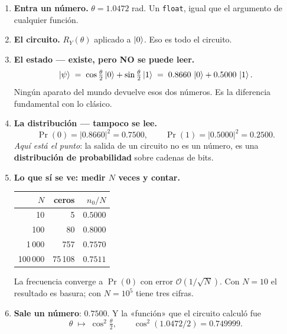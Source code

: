 \documentclass[11pt,a4paper]{article}
\begin{document}
\begin{enumerate}[leftmargin=2em]
  \item \textbf{Entra un número.} $\theta = 1.0472$ rad. Un \texttt{float},
    igual que el argumento de cualquier función.

  \item \textbf{El circuito.} $R_Y(\theta)$ aplicado a $\ket{0}$. Eso es
    todo el circuito.

  \item \textbf{El estado --- existe, pero NO se puede leer.}
    \begin{equation*}
      \ket{\psi} \;=\; \cos\tfrac{\theta}{2}\ket{0}
                     + \sin\tfrac{\theta}{2}\ket{1}
                 \;=\; 0.8660\,\ket{0} + 0.5000\,\ket{1}.
    \end{equation*}
    Ningún aparato del mundo devuelve esos dos números. Es la diferencia
    fundamental con lo clásico.

  \item \textbf{La distribución --- tampoco se lee.}
    \begin{equation*}
      \Pr(0) = |0.8660|^2 = 0.7500,
      \qquad
      \Pr(1) = |0.5000|^2 = 0.2500 .
    \end{equation*}
    \emph{Aquí está el punto}: la salida de un circuito no es un número, es
    una \textbf{distribución de probabilidad} sobre cadenas de bits.

  \item \textbf{Lo que sí se ve: medir $N$ veces y contar.}
    \begin{center}
    \small
    \begin{tabular}{rrr}
    \toprule
    $N$ & ceros & $n_0/N$ \\
    \midrule
    10      & 5      & $0.5000$ \\
    100     & 80     & $0.8000$ \\
    1\,000  & 757    & $0.7570$ \\
    100\,000& 75\,108& $0.7511$ \\
    \bottomrule
    \end{tabular}
    \end{center}
    La frecuencia converge a $\Pr(0)$ con error $\mathcal{O}(1/\sqrt{N})$.
    Con $N=10$ el resultado es basura; con $N=10^5$ tiene tres cifras.

  \item \textbf{Sale un número}: $0.7500$. Y la «función» que el circuito
    calculó fue
    \begin{equation*}
      \theta \;\longmapsto\; \cos^2\!\tfrac{\theta}{2},
      \qquad \cos^2(1.0472/2) = 0.749999 .
    \end{equation*}
\end{enumerate}
\end{document}
